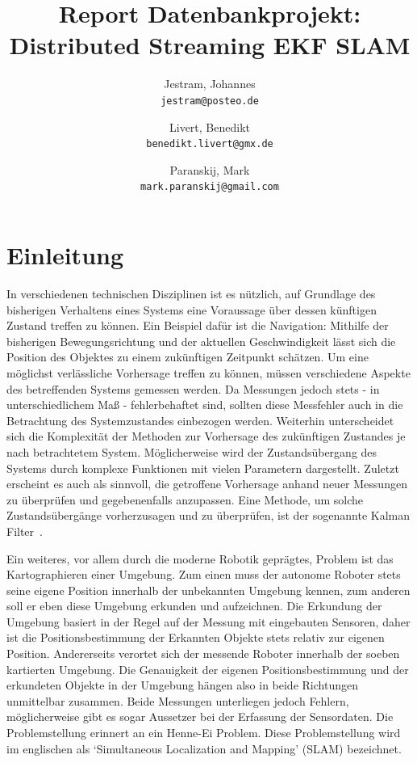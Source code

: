 \documentclass[11pt]{article}
\author{
  Jestram, Johannes\\
  \texttt{jestram@posteo.de}
	\and
	Livert, Benedikt\\
	\texttt{benedikt.livert@gmx.de}
	\and
	Paranskij, Mark\\
	\texttt{mark.paranskij@gmail.com}
}
\title{Report Datenbankprojekt: Distributed Streaming EKF SLAM}
\begin{document}
\maketitle
\newpage

\tableofcontents
\newpage

\section{Einleitung}\label{Einleitung}
In verschiedenen technischen Disziplinen ist es nützlich, auf Grundlage des bisherigen Verhaltens eines Systems eine Voraussage über dessen künftigen Zustand treffen zu können. Ein Beispiel dafür ist die Navigation: Mithilfe der bisherigen Bewegungsrichtung und der aktuellen Geschwindigkeit lässt sich die Position des Objektes zu einem zukünftigen Zeitpunkt schätzen. Um eine möglichst verlässliche Vorhersage treffen zu können, müssen verschiedene Aspekte des betreffenden Systems gemessen werden. Da Messungen jedoch stets - in unterschiedlichem Maß - fehlerbehaftet sind, sollten diese Messfehler auch in die Betrachtung des Systemzustandes einbezogen werden. Weiterhin unterscheidet sich die Komplexität der Methoden zur Vorhersage des zukünftigen Zustandes je nach betrachtetem System. Möglicherweise wird der Zustandsübergang des Systems durch komplexe Funktionen mit vielen Parametern dargestellt. Zuletzt erscheint es auch als sinnvoll, die getroffene Vorhersage anhand neuer Messungen zu überprüfen und gegebenenfalls anzupassen. Eine Methode, um solche Zustandsübergänge vorherzusagen und zu überprüfen, ist der sogenannte Kal\-man Filter~\cite{kalman1960new}.

Ein weiteres, vor allem durch die moderne Robotik geprägtes, Problem ist das Kartographieren einer Umgebung. Zum einen muss der autonome Roboter stets seine eigene Position innerhalb der unbekannten Umgebung kennen, zum anderen soll er eben diese Umgebung erkunden und aufzeichnen. Die Erkundung der Umgebung basiert in der Regel auf der Messung mit eingebauten Sensoren, daher ist die Positionsbestimmung der Erkannten Objekte stets relativ zur eigenen Position. Andererseits verortet sich der messende Roboter innerhalb der soeben kartierten Umgebung. Die Genauigkeit der eigenen Positionsbestimmung und der erkundeten Objekte in der Umgebung hängen also in beide Richtungen unmittelbar zusammen. Beide Messungen unterliegen jedoch Fehlern, möglicherweise gibt es sogar Aussetzer bei der Erfassung der Sensordaten. Die Problemstellung erinnert an ein Henne-Ei Problem. Diese Problemstellung wird im englischen als ‘Simultaneous Localization and Mapping’ (SLAM) bezeichnet.
\end{document}
